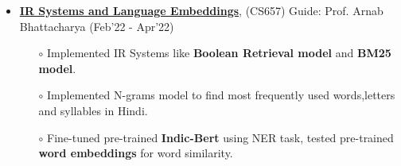 \documentclass[10.8pt, a4paper]{extarticle}
\begin{document}
\begin{itemize}
    
    	\item \href{https://github.com/jeetsarangi/Experiments-with-Indian-Linguistic-Embeddings-and-Language-Corpora}{\textbf{IR Systems and Language Embeddings}}, (CS657) Guide: Prof. Arnab Bhattacharya \hfill(Feb'22 - Apr'22)
	\\[-0.6cm]
	\begin{itemize}
	      \item[$\circ$] Implemented IR Systems like \textbf{Boolean Retrieval model} and \textbf{BM25 model}. \\[-0.6cm]
	      \item[$\circ$] Implemented N-grams model to find most frequently used words,letters and syllables in Hindi.\\[-0.6cm]
	      
	      \item[$\circ$] Fine-tuned pre-trained \textbf{Indic-Bert} using NER task, tested pre-trained \textbf{word embeddings} for word similarity. \\[-0.6cm]
	      
	\end{itemize}



	      

\end{itemize}
\end{document}
